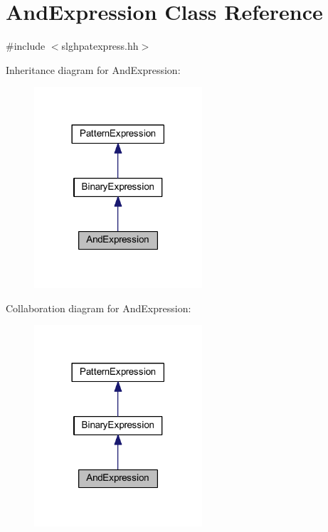 \hypertarget{class_and_expression}{}\section{And\+Expression Class Reference}
\label{class_and_expression}


{\ttfamily \#include $<$slghpatexpress.\+hh$>$}



Inheritance diagram for And\+Expression\+:
\nopagebreak
\begin{figure}[H]
\begin{center}
\leavevmode
\includegraphics[width=177pt]{class_and_expression__inherit__graph}
\end{center}
\end{figure}


Collaboration diagram for And\+Expression\+:
\nopagebreak
\begin{figure}[H]
\begin{center}
\leavevmode
\includegraphics[width=177pt]{class_and_expression__coll__graph}
\end{center}
\end{figure}
